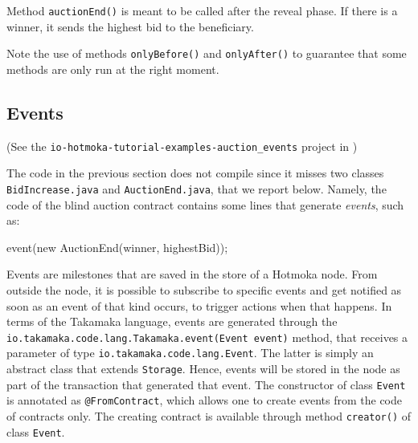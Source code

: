 Method \texttt{auctionEnd()} is meant to be called after the reveal phase.
If there is a winner, it sends the highest bid to the beneficiary.

Note the use of methods \texttt{onlyBefore()} and \texttt{onlyAfter()} to guarantee
that some methods are only run at the right moment.

\subsection{Events}\label{subsec:events}

\begin{center}
(See the \texttt{io-hotmoka-tutorial-examples-auction\_events} project in \hotmokaRepo{})
\end{center}

The code in the previous section does not compile since it misses two
classes \texttt{BidIncrease.java} and \texttt{AuctionEnd.java}, that we report below.
Namely, the code of the blind auction contract contains some lines that generate
\emph{events}, such as:
%
\begin{codebox}\begin{javalst}
event(new AuctionEnd(winner, highestBid));
\end{javalst}\end{codebox}

Events are milestones that are saved in the store of a Hotmoka node.
From outside the node, it is possible to subscribe to specific events and get
notified as soon as an event of that kind occurs,
to trigger actions when that happens. In terms of the
Takamaka language, events are generated through the
\texttt{io.takamaka.code.lang.Takamaka.event(Event event)} method,
that receives a parameter
of type \texttt{io.takamaka.code.lang.Event}. The latter is simply an abstract class that
extends \texttt{Storage}. Hence, events will
be stored in the node as part of the transaction that generated that event.
The constructor of class \texttt{Event} is annotated as \texttt{@FromContract}, which allows one
to create events from the code of contracts only. The creating contract is available
through method \texttt{creator()} of class \texttt{Event}.

